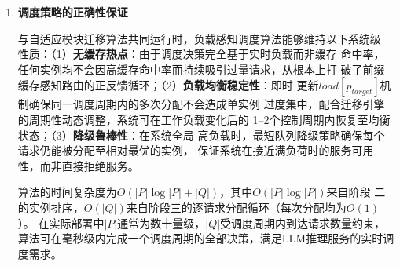 \begin{enumerate}
第11--12行处理目标实例已达到负载上限（$load[p_{target}] \geq \delta_L$）
的降级情形。此时所有实例均处于较重的负载状态，理想的最轻负载实例已无
法在阈值内接受新请求。第11行切换策略，从$candidates$中按最短队列策略
（lowest-queue）重新选取目标实例，即选择当前等待队列最短的实例作为分
配目标。队列最短的实例意味着已积压的待处理请求最少，即便其综合利用率
较高，也能相对最快地开始处理新请求，从而最小化$req$的等待延迟。第12行
执行分配操作，将$req$追加至所选实例的等待队列末尾。与标准情形不同，
此处不更新$load$值，因为$req$尚未开始处理，其实际负载贡献无法确定，
贸然更新$load$可能影响后续请求的调度准确性。

第13行在标准情形（第9行分配后）已隐式完成了$load$更新，此处无需额外
操作即可进入下一个请求$req$的调度，实现了$O(1)$的单请求调度复杂度。

\textbf{阶段四：生成调度方案（第14--15行）}

第14行在遍历完$Q$中所有请求并完成分配后，调用GetDispatchMap($P$)汇总
各Prefill实例的最终分配结果，生成调度映射$D^*$。$D^*$以字典形式记录
每个请求与其目标Prefill实例的对应关系，以及目标实例在接收新请求后的
预期负载状态，供BanaServe的编排组件（Orchestration Layer）按此映射关
系将请求实际路由至对应实例的推理队列。

第15行返回$D^*$，完成本调度周期的全部决策。由于BanaServe的调度器以
周期性方式运行（每50--100 ms执行一次），$D^*$仅在当前周期内有效；下
一周期开始时，算法将重新测量所有实例的最新负载状态并重新排序，确保
调度决策持续追踪系统的动态变化。

\item \textbf{调度策略的正确性保证}

与自适应模块迁移算法共同运行时，负载感知调度算法能够维持以下系统级
性质：（1）\textbf{无缓存热点}：由于调度决策完全基于实时负载而非缓存
命中率，任何实例均不会因高缓存命中率而持续吸引过量请求，从根本上打
破了前缀缓存感知路由的正反馈循环；（2）\textbf{负载均衡稳定性}：即时
更新$load[p_{target}]$机制确保同一调度周期内的多次分配不会造成单实例
过度集中，配合迁移引擎的周期性动态调整，系统可在工作负载变化后的
1--2个控制周期内恢复至均衡状态；（3）\textbf{降级鲁棒性}：在系统全局
高负载时，最短队列降级策略确保每个请求仍能被分配至相对最优的实例，
保证系统在接近满负荷时的服务可用性，而非直接拒绝服务。

算法的时间复杂度为$O(|P|\log|P| + |Q|)$，其中$O(|P|\log|P|)$来自阶段
二的实例排序，$O(|Q|)$来自阶段三的逐请求分配循环（每次分配均为$O(1)$）。
在实际部署中$|P|$通常为数十量级，$|Q|$受调度周期内到达请求数量约束，
算法可在毫秒级内完成一个调度周期的全部决策，满足LLM推理服务的实时调
度需求。




\end{enumerate}
